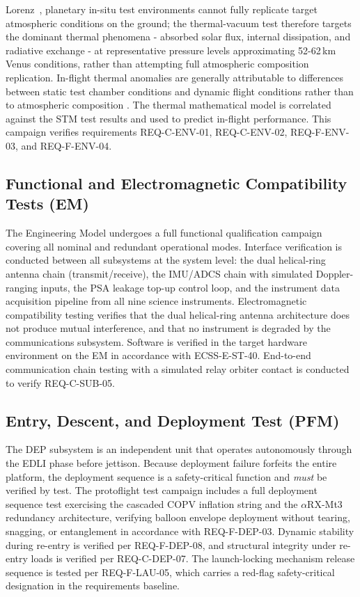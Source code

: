 Lorenz~\cite{Lorenz2018}, planetary in-situ test environments cannot fully replicate target atmospheric conditions on the ground; the thermal-vacuum test therefore targets the dominant thermal phenomena - absorbed solar flux, internal dissipation, and radiative exchange - at representative pressure levels approximating 52-62\,km Venus conditions, rather than attempting full atmospheric composition replication. In-flight thermal anomalies are generally attributable to differences between static test chamber conditions and dynamic flight conditions rather than to atmospheric composition \cite{Lorenz2018}. The thermal mathematical model is correlated against the STM test results and used to predict in-flight performance. This campaign verifies requirements REQ-C-ENV-01, REQ-C-ENV-02, REQ-F-ENV-03, and REQ-F-ENV-04.

\subsection{Functional and Electromagnetic Compatibility Tests (EM)}

The Engineering Model undergoes a full functional qualification campaign covering all nominal and redundant operational modes. Interface verification is conducted between all subsystems at the system level: the dual helical-ring antenna chain (transmit/receive), the IMU/ADCS chain with simulated Doppler-ranging inputs, the PSA leakage top-up control loop, and the instrument data acquisition pipeline from all nine science instruments. Electromagnetic compatibility testing verifies that the dual helical-ring antenna architecture does not produce mutual interference, and that no instrument is degraded by the communications subsystem. Software is verified in the target hardware environment on the EM in accordance with ECSS-E-ST-40. End-to-end communication chain testing with a simulated relay orbiter contact is conducted to verify REQ-C-SUB-05.

\subsection{Entry, Descent, and Deployment Test (PFM)}

The DEP subsystem is an independent unit that operates autonomously through the EDLI phase before jettison. Because deployment failure forfeits the entire platform, the deployment sequence is a safety-critical function and \emph{must} be verified by test. The protoflight test campaign includes a full deployment sequence test exercising the cascaded COPV inflation string and the $\alpha$RX-Mt3 redundancy architecture, verifying balloon envelope deployment without tearing, snagging, or entanglement in accordance with REQ-F-DEP-03. Dynamic stability during re-entry is verified per REQ-F-DEP-08, and structural integrity under re-entry loads is verified per REQ-C-DEP-07. The launch-locking mechanism release sequence is tested per REQ-F-LAU-05, which carries a red-flag safety-critical designation in the requirements baseline.


